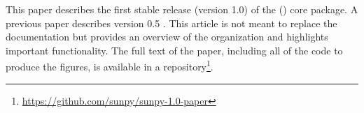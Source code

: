This paper describes the first stable release (version 1.0) of the (\sunpypkg) core package.
A previous paper describes version 0.5 \citep{Community:2015cy}.
This article is not meant to replace the \sunpypkg documentation but provides an overview of the organization and highlights important functionality.
The full text of the paper, including all of the code to produce the figures, is available in a \github repository\footnote{\url{https://github.com/sunpy/sunpy-1.0-paper}}.